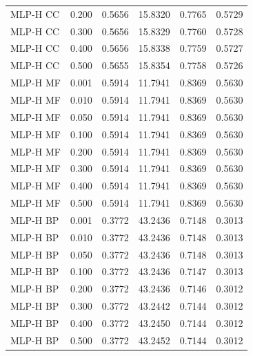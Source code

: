 \begin{longtable}{lrrrrr}
MLP-H CC & 0.200 & 0.5656 & 15.8320 & 0.7765 & 0.5729 \\
MLP-H CC & 0.300 & 0.5656 & 15.8329 & 0.7760 & 0.5728 \\
MLP-H CC & 0.400 & 0.5656 & 15.8338 & 0.7759 & 0.5727 \\
MLP-H CC & 0.500 & 0.5655 & 15.8354 & 0.7758 & 0.5726 \\
MLP-H MF & 0.001 & 0.5914 & 11.7941 & 0.8369 & 0.5630 \\
MLP-H MF & 0.010 & 0.5914 & 11.7941 & 0.8369 & 0.5630 \\
MLP-H MF & 0.050 & 0.5914 & 11.7941 & 0.8369 & 0.5630 \\
MLP-H MF & 0.100 & 0.5914 & 11.7941 & 0.8369 & 0.5630 \\
MLP-H MF & 0.200 & 0.5914 & 11.7941 & 0.8369 & 0.5630 \\
MLP-H MF & 0.300 & 0.5914 & 11.7941 & 0.8369 & 0.5630 \\
MLP-H MF & 0.400 & 0.5914 & 11.7941 & 0.8369 & 0.5630 \\
MLP-H MF & 0.500 & 0.5914 & 11.7941 & 0.8369 & 0.5630 \\
MLP-H BP & 0.001 & 0.3772 & 43.2436 & 0.7148 & 0.3013 \\
MLP-H BP & 0.010 & 0.3772 & 43.2436 & 0.7148 & 0.3013 \\
MLP-H BP & 0.050 & 0.3772 & 43.2436 & 0.7148 & 0.3013 \\
MLP-H BP & 0.100 & 0.3772 & 43.2436 & 0.7147 & 0.3013 \\
MLP-H BP & 0.200 & 0.3772 & 43.2436 & 0.7146 & 0.3012 \\
MLP-H BP & 0.300 & 0.3772 & 43.2442 & 0.7144 & 0.3012 \\
MLP-H BP & 0.400 & 0.3772 & 43.2450 & 0.7144 & 0.3012 \\
MLP-H BP & 0.500 & 0.3772 & 43.2452 & 0.7144 & 0.3012 \\
\bottomrule
\end{longtable}
\endgroup
